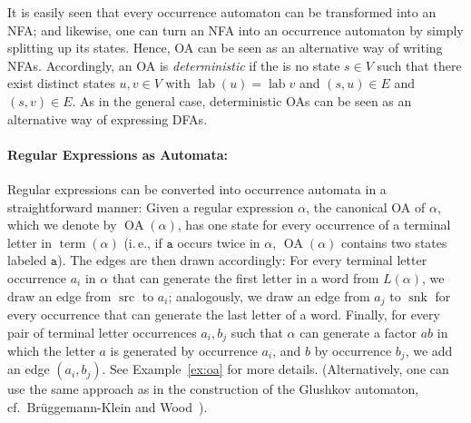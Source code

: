 \documentclass[a4paper,11pt, svgnames,titlepage]{article}
\DeclareMathOperator{\lab}{lab}
\DeclareMathOperator{\src}{src}
\DeclareMathOperator{\snk}{snk}
\DeclareMathOperator{\OA}{OA}
\DeclareMathOperator{\term}{term}
\begin{document}
It is easily seen that every occurrence automaton can be transformed into an NFA; and likewise, one can turn an NFA into an occurrence automaton by simply splitting up its states. Hence, OA can be seen  as an alternative way of writing NFAs. Accordingly, an OA is \emph{deterministic} if the is no state $s\in V$ such that there exist distinct states $u,v\in V$ with $\lab(u)=\lab{v}$ and $(s,u)\in E$ and $(s,v)\in E$. As in the general case, deterministic OAs can be seen as an alternative way of expressing DFAs.

\paragraph{Regular Expressions as Automata:} Regular expressions can be converted into occurrence automata in a straightforward manner: Given a regular expression $\alpha$, the canonical OA of $\alpha$, which we denote by $\OA(\alpha)$, has one state for every occurrence of a terminal letter in $\term(\alpha)$ (i.\,e., if $\mathtt{a}$ occurs twice in $\alpha$, $\OA(\alpha)$ contains two states labeled $\mathtt{a}$). The edges are then drawn accordingly: For every terminal letter occurrence $a_i$ in $\alpha$ that can generate the first letter in a word from $L(\alpha)$, we draw an edge from $\src$ to $a_i$; analogously, we draw an edge from $a_j$ to $\snk$ for every occurrence that can generate the last letter of a word. Finally, for every pair of terminal letter occurrences $a_i,b_j$ such that $\alpha$ can generate a factor $ab$ in which the letter $a$ is generated by occurrence $a_i$, and $b$ by occurrence $b_j$, we add an edge $(a_i,b_j)$. See Example~\ref{ex:oa} for more details. (Alternatively, one can use the same approach as in the construction of the Glushkov automaton, cf.\ Brüggemann-Klein and Wood~\cite{bru:one}).
\end{document}
